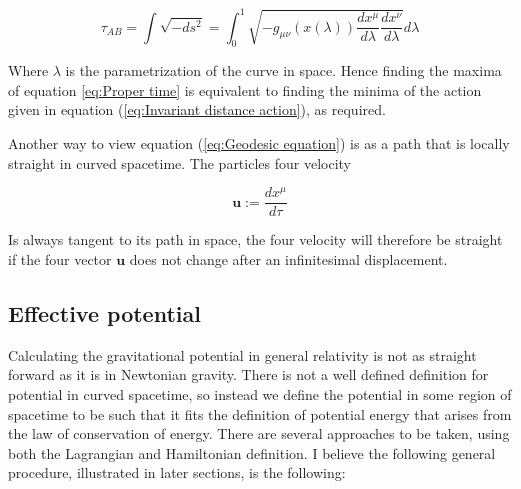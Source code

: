 \begin{equation}
    \tau_{AB} = \int \sqrt{- ds^2} = \int_0^1 \sqrt{-g_{\mu \nu}(x(\lambda))
    \frac{dx^\mu}{d\lambda} \frac{dx^\nu}{d\lambda}}d\lambda 
\label{eq:Proper time}
\end{equation}

Where $\lambda$ is the parametrization of the curve in space. Hence finding the maxima of equation \ref{eq:Proper time} is equivalent to finding the minima of the action given in equation (\ref{eq:Invariant distance action}), as required.

Another way to view equation (\ref{eq:Geodesic equation}) is as a path that is locally straight in curved spacetime. The particles four velocity

\begin{equation}\label{eq:Four velocity}
    \boldsymbol{u} := \frac{dx^\mu}{d\tau}
\end{equation}

Is always tangent to its path in space, the four velocity will therefore be straight if the four vector $\boldsymbol{u}$ does not change after an infinitesimal displacement.

    



\subsection{Effective potential}
Calculating the gravitational potential in general relativity is not as straight forward as it is in Newtonian gravity. There is not a well defined definition for potential in curved spacetime, so instead we define the potential in some region of spacetime to be such that it fits the definition of potential energy that arises from the law of conservation of energy. There are several approaches to be taken, using both the Lagrangian and Hamiltonian definition. I believe the following general procedure, illustrated in later sections, is the following:


